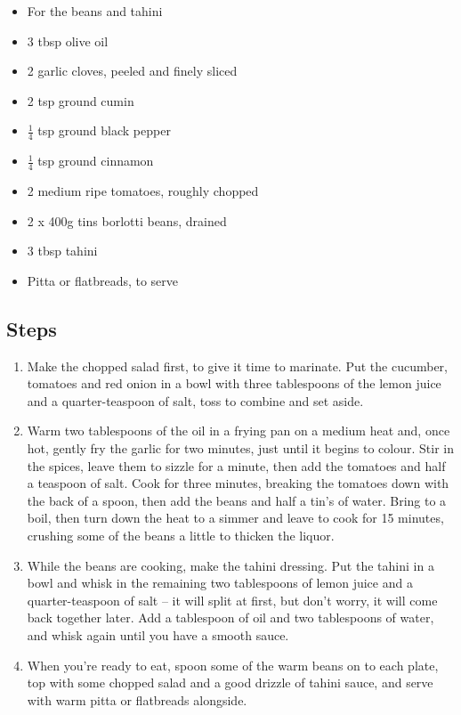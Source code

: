 \documentclass{book}
\begin{document}
\begin{itemize}
\item For the beans and tahini
\item 3 tbsp olive oil 
\item 2 garlic cloves, peeled and finely sliced
\item 2 tsp ground cumin 
\item $\frac{1}{4}$ tsp ground black pepper
\item $\frac{1}{4}$ tsp ground cinnamon
\item 2 medium ripe tomatoes, roughly chopped 
\item 2 x 400g tins borlotti beans, drained 
\item 3 tbsp tahini
\item Pitta or flatbreads, to serve
\end{itemize}

\subsection*{Steps}
\begin{enumerate}
\item Make the chopped salad first, to give it time to marinate. Put the cucumber, tomatoes and red onion in a bowl with three tablespoons of the lemon juice and a quarter-teaspoon of salt, toss to combine and set aside.
\item Warm two tablespoons of the oil in a frying pan on a medium heat and, once hot, gently fry the garlic for two minutes, just until it begins to colour. Stir in the spices, leave them to sizzle for a minute, then add the tomatoes and half a teaspoon of salt. Cook for three minutes, breaking the tomatoes down with the back of a spoon, then add the beans and half a tin’s of water. Bring to a boil, then turn down the heat to a simmer and leave to cook for 15 minutes, crushing some of the beans a little to thicken the liquor.
\item While the beans are cooking, make the tahini dressing. Put the tahini in a bowl and whisk in the remaining two tablespoons of lemon juice and a quarter-teaspoon of salt – it will split at first, but don’t worry, it will come back together later. Add a tablespoon of oil and two tablespoons of water, and whisk again until you have a smooth sauce.
\item When you’re ready to eat, spoon some of the warm beans on to each plate, top with some chopped salad and a good drizzle of tahini sauce, and serve with warm pitta or flatbreads alongside.
\end{enumerate}
\newpage
\end{document}
